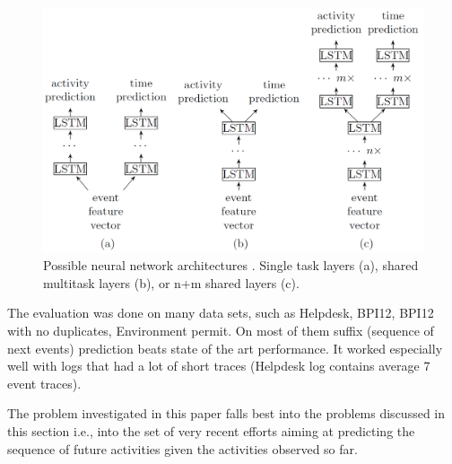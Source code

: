 \begin{figure}[!ht]
	\begin{center}  
		\includegraphics[width=\textwidth]{1.png}
		\caption{Possible neural network architectures \cite{niek96732}. Single task layers (a), shared multitask layers (b), or n+m shared layers (c).}
		\label{figure:architectureslstm}	
	\end{center}
\end{figure}


The evaluation was done on many data sets, such as Helpdesk, BPI12, BPI12 with no duplicates, Environment permit. On most of them suffix (sequence of next events) prediction beats state of the art performance. It worked especially well with logs that had a lot of short traces (Helpdesk log contains average 7 event traces).

The problem investigated in this paper falls best into the problems discussed in this section i.e., into the set of very recent efforts aiming at predicting the sequence of future activities given the activities observed so far.



